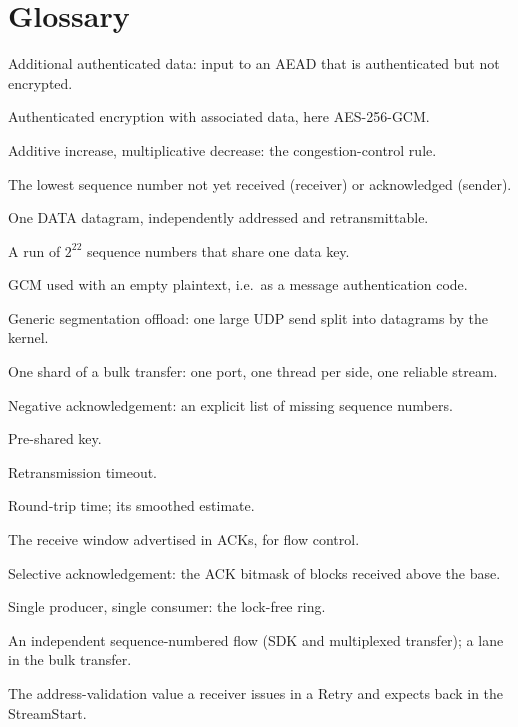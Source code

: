 \chapter{Glossary}\label{app:glossary}

\begin{description}[leftmargin=2.6cm,labelwidth=2.4cm,style=sameline,itemsep=1pt]
  \item[AAD] Additional authenticated data: input to an AEAD that is authenticated but not encrypted.
  \item[AEAD] Authenticated encryption with associated data, here AES-256-GCM.
  \item[AIMD] Additive increase, multiplicative decrease: the congestion-control rule.
  \item[Base] The lowest sequence number not yet received (receiver) or acknowledged (sender).
  \item[Block] One DATA datagram, independently addressed and retransmittable.
  \item[Epoch] A run of $2^{22}$ sequence numbers that share one data key.
  \item[GMAC] GCM used with an empty plaintext, i.e.\ as a message authentication code.
  \item[GSO] Generic segmentation offload: one large UDP send split into datagrams by the kernel.
  \item[Lane] One shard of a bulk transfer: one port, one thread per side, one reliable stream.
  \item[NACK] Negative acknowledgement: an explicit list of missing sequence numbers.
  \item[PSK] Pre-shared key.
  \item[RTO] Retransmission timeout.
  \item[RTT, SRTT] Round-trip time; its smoothed estimate.
  \item[rwnd] The receive window advertised in ACKs, for flow control.
  \item[SACK] Selective acknowledgement: the ACK bitmask of blocks received above the base.
  \item[SPSC] Single producer, single consumer: the lock-free ring.
  \item[Stream] An independent sequence-numbered flow (SDK and multiplexed transfer); a lane in the bulk transfer.
  \item[Token] The address-validation value a receiver issues in a Retry and expects back in the StreamStart.
\end{description}

